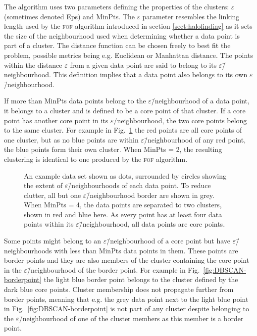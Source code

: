 \documentclass[english, oneside]{HYgradu}
\begin{document}
The algorithm uses two parameters defining the properties of the clusters: $\varepsilon$ (sometimes denoted Eps) and MinPts. The $\varepsilon$ parameter resembles the linking length used by the \textsc{fof} algorithm introduced in section \ref{sect:halofinding} as it sets the size of the neighbourhood used when determining whether a data point is part of a cluster. The distance function can be chosen freely to best fit the problem, possible metrics being e.g. Euclidean or Manhattan distance. The points within the distance $\varepsilon$ from a given data point are said to belong to its $\varepsilon$\=/neighbourhood. This definition implies that a data point also belongs to its own $\varepsilon$\=/neighbourhood.

If more than MinPts data points belong to the $\varepsilon$\=/neighbourhood of a data point, it belongs to a cluster and is defined to be a core point of that cluster. If a core point has another core point in its $\varepsilon$\=/neighbourhood, the two core points belong to the same cluster. For example in Fig.\ \ref{fig:DBSCAN-twocores} the red points are all core points of one cluster, but as no blue points are within $\varepsilon$\=/neighbourhood of any red point, the blue points form their own cluster. When MinPts = 2, the resulting clustering is identical to one produced by the \textsc{fof} algorithm.

\begin{figure}
    \centering
    
    \caption{An example data set shown as dots, surrounded by circles showing the extent of $\varepsilon$\=/neighbourhoods of each data point. To reduce clutter, all but one $\varepsilon$\=/neighbourhood border are shown in grey. When MinPts = 4, the data points are separated to two clusters, shown in red and blue here. As every point has at least four data points within its $\varepsilon$\=/neighbourhood, all data points are core points.}\label{fig:DBSCAN-twocores}
\end{figure}

Some points might belong to an $\varepsilon$\=/neighbourhood of a core point but have $\varepsilon$\=/neighbourhoods with less than MinPts data points in them. These points are border points and they are also members of the cluster containing the core point in the $\varepsilon$\=/neighbourhood of the border point. For example in Fig.\ \ref{fig:DBSCAN-borderpoint} the light blue border point belongs to the cluster defined by the dark blue core points. Cluster membership does not propagate further from border points, meaning that e.g. the grey data point next to the light blue point in Fig.\ \ref{fig:DBSCAN-borderpoint} is not part of any cluster despite belonging to the $\varepsilon$\=/neighbourhood of one of the cluster members as this member is a border point.
\end{document}
